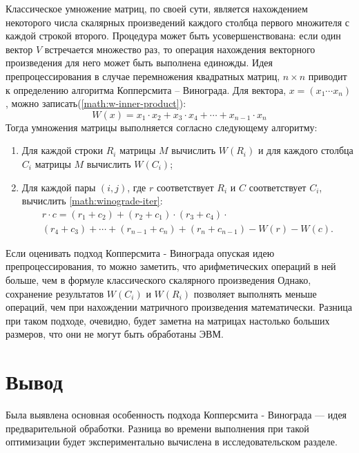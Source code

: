Классическое умножение матриц, по своей сути, является нахождением некоторого числа скалярных произведений каждого столбца первого множителя с каждой строкой второго. Процедура может быть усовершенствована: если один вектор $V$ встречается множество раз, то операция нахождения векторного произведения для него может быть выполнена единожды. Идея препроцессирования в случае перемножения квадратных матриц, $n \times n$ приводит к определению алгоритма Копперсмита – Винограда. Для вектора, $x = \left(x_1 \cdots x_n\right)$, можно записать(\ref{math:w-inner-product}):
\begin{equation}\label{math:w-inner-product}
	W(x) = x_1 \cdot x_2 + x_3 \cdot x_4 + \cdots + x_{n - 1} \cdot x_n
\end{equation}
Тогда умножения матрицы выполняется согласно следующему алгоритму:
\begin{enumerate}
	\item Для каждой строки $R_i$ матрицы $M$ вычислить $W(R_i)$ и для каждого столбца $C_i$ матрицы $M$ вычислить $W(C_i)$;
	\item Для каждой пары $(i ,j)$, где $r$ соответствует $R_i$ и $C$ соответствует $C_i$, вычислить \ref{math:winograde-iter}:
	\begin{equation}\label{math:winograde-iter} 
		\begin{array}{cc}
			r \cdot c = \left(r_1 + c_2\right) + \left(r_2 + c_1\right) \cdot \left(r_3 + c_4\right) \cdot \\
			\left(r_4 + c_3\right) + \cdots +  \left(r_{n - 1} + c_n\right) + \left(r_{n} + c_{n - 1}\right) - W\left(r\right) - W\left(c\right).
		\end{array}
	\end{equation}
\end{enumerate}

Если оценивать подход Копперсмита - Винограда опуская идею препроцессирования, то можно заметить, что арифметических операций в ней больше, чем в формуле классического скалярного произведения Однако, сохранение результатов $W(C_i)$ и $W(R_i)$ позволяет выполнять меньше операций, чем при нахождении матричного произведения математически. Разница при таком подходе, очевидно, будет заметна на матрицах настолько больших размеров, что они не могут быть обработаны ЭВМ. 

\section{Вывод}
Была выявлена основная особенность подхода Копперсмита - Винограда --- идея предварительной обработки. Разница во времени выполнения при такой оптимизации будет экспериментально вычислена в исследовательском разделе. 
